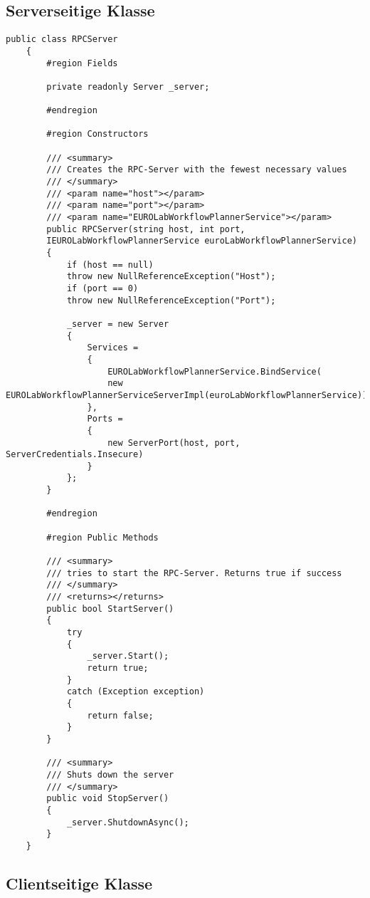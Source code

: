 \subsection{Serverseitige Klasse}
\label{app:ServerseitigeKlasse}

\lstset{style=sharpc}
\begin{lstlisting}[caption={Serverseitige Klasse}]
	public class RPCServer
	{
		#region Fields
		
		private readonly Server _server;
		
		#endregion
		
		#region Constructors
		
		/// <summary>
		/// Creates the RPC-Server with the fewest necessary values
		/// </summary>
		/// <param name="host"></param>
		/// <param name="port"></param>
		/// <param name="EUROLabWorkflowPlannerService"></param>
		public RPCServer(string host, int port,
		IEUROLabWorkflowPlannerService euroLabWorkflowPlannerService)
		{
			if (host == null)
			throw new NullReferenceException("Host");
			if (port == 0)
			throw new NullReferenceException("Port");
			
			_server = new Server
			{
				Services =
				{
					EUROLabWorkflowPlannerService.BindService(
					new EUROLabWorkflowPlannerServiceServerImpl(euroLabWorkflowPlannerService))
				},
				Ports =
				{
					new ServerPort(host, port, ServerCredentials.Insecure)
				}
			};
		}
		
		#endregion
		
		#region Public Methods
		
		/// <summary>
		/// tries to start the RPC-Server. Returns true if success
		/// </summary>
		/// <returns></returns>
		public bool StartServer()
		{
			try
			{
				_server.Start();
				return true;
			}
			catch (Exception exception)
			{
				return false;
			}
		}
		
		/// <summary>
		/// Shuts down the server
		/// </summary>
		public void StopServer()
		{
			_server.ShutdownAsync();
		}
	}
\end{lstlisting}

\subsection{Clientseitige Klasse}
\label{app:ClientseitigeKlasse}

